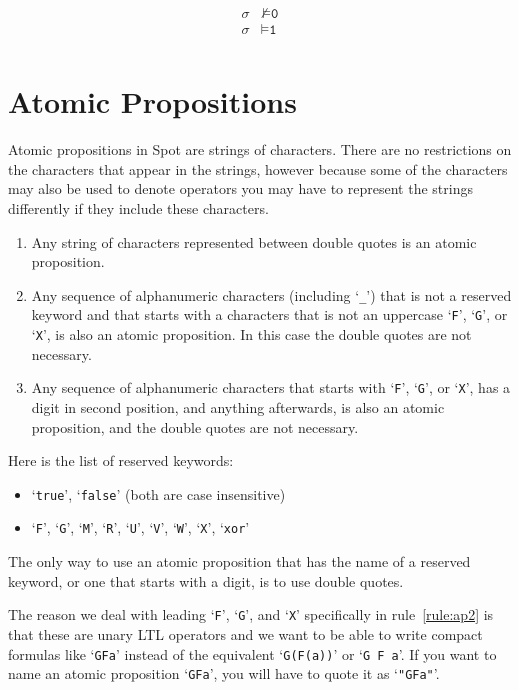 \documentclass[a4paper,twoside,10pt,DIV=12]{scrreprt}
\newcommand{\0}{\texttt{0}}
\newcommand{\1}{\texttt{1}}
\newcommand\samp[1]{`\texttt{#1}'}
\begin{document}
\begin{align*}
  \sigma &\nvDash \0 \\
  \sigma &\vDash \1 \\
\end{align*}

\section{Atomic Propositions}\label{sec:ap}

Atomic propositions in Spot are strings of characters.  There are no
restrictions on the characters that appear in the strings, however
because some of the characters may also be used to denote operators
you may have to represent the strings differently if they include
these characters.

\begin{enumerate}
\item Any string of characters represented between double quotes is an
  atomic proposition.
\item Any sequence of alphanumeric characters \label{rule:ap2}
  (including \samp{\_}) that is not a reserved keyword and that starts
  with a characters that is not an uppercase \samp{F}, \samp{G}, or
  \samp{X}, is also an atomic proposition.  In this case the double
  quotes are not necessary.
\item \label{rule:ap3} Any sequence of alphanumeric characters that
  starts with \samp{F}, \samp{G}, or \samp{X}, has a digit in second
  position, and anything afterwards, is also an atomic proposition,
  and the double quotes are not necessary.
\end{enumerate}

Here is the list of reserved keywords:
\begin{itemize}
\item \samp{true}, \samp{false}  (both are case insensitive)
\item \samp{F}, \samp{G}, \samp{M}, \samp{R}, \samp{U}, \samp{V},
  \samp{W}, \samp{X}, \samp{xor}
\end{itemize}

The only way to use an atomic proposition that has the name of a
reserved keyword, or one that starts with a digit, is to use double quotes.

The reason we deal with leading \samp{F}, \samp{G}, and \samp{X}
specifically in rule~\ref{rule:ap2} is that these are unary LTL
operators and we want to be able to write compact formulas like
\samp{GFa} instead of the equivalent \samp{G(F(a))} or
\samp{G~F~a}.  If you want to name an atomic proposition \samp{GFa},
you will have to quote it as \samp{"GFa"}.
\end{document}
